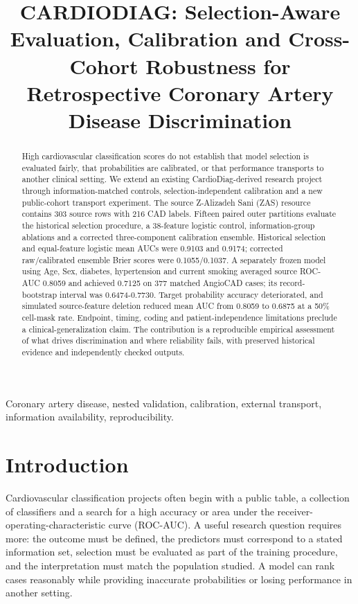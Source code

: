 \documentclass[conference]{IEEEtran}
\title{CARDIODIAG: Selection-Aware Evaluation, Calibration and Cross-Cohort Robustness for Retrospective Coronary Artery Disease Discrimination}
\author{\IEEEauthorblockN{Erukudinnela Akhil Preetham, Chunduri Hari Krishna, G Vennela}\IEEEauthorblockA{Department of Computer Science and Engineering\\Prasad V. Potluri Siddhartha Institute of Technology (PVPSIT)\\Vijayawada, Andhra Pradesh, India\\Project guide: K. Naga Gopi}}
\begin{document}
\pagestyle{plain}
\maketitle
\thispagestyle{plain}
\begin{abstract}
High cardiovascular classification scores do not establish that model selection is evaluated fairly, that probabilities are calibrated, or that performance transports to another clinical setting. We extend an existing CardioDiag-derived research project through information-matched controls, selection-independent calibration and a new public-cohort transport experiment. The source Z-Alizadeh Sani (ZAS) resource contains 303 source rows with 216 CAD labels. Fifteen paired outer partitions evaluate the historical selection procedure, a 38-feature logistic control, information-group ablations and a corrected three-component calibration ensemble. Historical selection and equal-feature logistic mean AUCs were 0.9103 and 0.9174; corrected raw/calibrated ensemble Brier scores were 0.1055/0.1037. A separately frozen model using Age, Sex, diabetes, hypertension and current smoking averaged source ROC-AUC 0.8059 and achieved 0.7125 on 377 matched AngioCAD cases; its record-bootstrap interval was 0.6474-0.7730. Target probability accuracy deteriorated, and simulated source-feature deletion reduced mean AUC from 0.8059 to 0.6875 at a 50\% cell-mask rate. Endpoint, timing, coding and patient-independence limitations preclude a clinical-generalization claim. The contribution is a reproducible empirical assessment of what drives discrimination and where reliability fails, with preserved historical evidence and independently checked outputs.

\end{abstract}
\begin{IEEEkeywords}
Coronary artery disease, nested validation, calibration, external transport, information availability, reproducibility.

\end{IEEEkeywords}
\section{Introduction}
Cardiovascular classification projects often begin with a public table, a collection of classifiers and a search for a high accuracy or area under the receiver-operating-characteristic curve (ROC-AUC). A useful research question requires more: the outcome must be defined, the predictors must correspond to a stated information set, selection must be evaluated as part of the training procedure, and the interpretation must match the population studied. A model can rank cases reasonably while providing inaccurate probabilities or losing performance in another setting.
\end{document}
